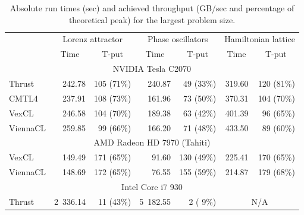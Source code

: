 \documentclass[final]{siamltex}
\begin{document}
\begin{table}
    \begin{small}
    \caption{Absolute run times (sec) and achieved throughput (GB/sec and
    percentage of theoretical peak) for the largest problem size.}
    \label{tab:abstimes}
    \begin{tabular}{|l|rrrrrr|}
        \hline
        & \multicolumn{2}{|c|}{Lorenz attractor}
        & \multicolumn{2}{|c|}{Phase oscillators}
        & \multicolumn{2}{|c|}{Hamiltonian lattice} \\
        \cline{2-7}
        & \multicolumn{1}{c}{Time} & \multicolumn{1}{|c|}{T-put}
        & \multicolumn{1}{c}{Time} & \multicolumn{1}{|c|}{T-put}
        & \multicolumn{1}{c}{Time} & \multicolumn{1}{|c|}{T-put} \\
        \hline
        \multicolumn{7}{|c|}{NVIDIA Tesla C2070} \\
        \hline
        Thrust           &   242.78 & 105 (71\%) &   240.87 &  49 (33\%) &  319.60 & 120 (81\%) \\
        CMTL4            &   237.91 & 108 (73\%) &   161.96 &  73 (50\%) &  370.31 & 104 (70\%) \\
        VexCL            &   246.58 & 104 (70\%) &   189.38 &  63 (42\%) &  401.39 &  96 (65\%) \\
        ViennaCL         &   259.85 &  99 (66\%) &   166.20 &  71 (48\%) &  433.50 &  89 (60\%) \\
        \hline
        \multicolumn{7}{|c|}{AMD Radeon HD 7970 (Tahiti)} \\
        \hline
        VexCL            &   149.49 & 171 (65\%) &    91.60 & 130 (49\%) &  225.41 & 170 (65\%) \\
        ViennaCL         &   148.69 & 172 (65\%) &    76.55 & 155 (59\%) &  214.87 & 179 (68\%) \\
        \hline
        \multicolumn{7}{|c|}{Intel Core i7 930} \\
        \hline
        Thrust           & 2~336.14 &  11 (43\%) & 5~182.55 &   2 ( 9\%) & \multicolumn{2}{c|}{N/A} \\

\end{tabular}
\end{small}
\end{table}
\end{document}
